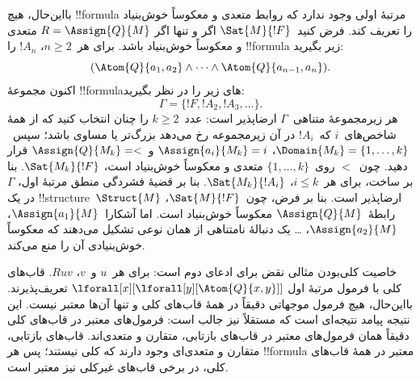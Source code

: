 \documentclass[../../../include/open-logic-section]{subfiles}
\begin{document}
بااین‌حال، هیچ !!{formula} مرتبهٔ اولی وجود ندارد که روابط متعدی و
معکوساً خوش‌بنیاد را تعریف کند. فرض کنید~$\Sat{M}{!F}$ اگر و تنها اگر
$R = \Assign{Q}{M}$ متعدی و معکوساً خوش‌بنیاد باشد. برای هر~$n \ge 2$،
$!A_n$ را !!{formula} زیر بگیرید:
\[
(\Atom{Q}{a_1,a_2} \land \dots \land
    \Atom{Q}{a_{n-1},a_{n}}).
\]
اکنون مجموعهٔ !!{formula}های زیر را در نظر بگیرید:
\[
\Gamma = \{!F, !A_2, !A_3, \dots\}.
\]
هر زیرمجموعهٔ متناهی~$\Gamma$ ارضاپذیر است: عدد~$k \ge 2$ را چنان
انتخاب کنید که از همهٔ شاخص‌های~$i$ که~$!A_i$ در آن زیرمجموعه رخ می‌دهد
بزرگ‌تر یا مساوی باشد؛ سپس~$\Domain{M_k} = \{1, \dots, k\}$،
$\Assign{a_i}{M_k} = i$ و~$\Assign{Q}{M_k} = <$ قرار دهید. چون~$<$
روی~$\{1,\dots,k\}$ متعدی و معکوساً خوش‌بنیاد است، $\Sat{M_k}{!F}$.
بنا بر ساخت، برای هر~$i \le k$، $\Sat{M_k}{!A_i}$. بنا بر قضیهٔ فشردگی
منطق مرتبهٔ اول، $\Gamma$ در یک !!{structure}~$\Struct{M}$ ارضاپذیر
است. بنا بر فرض، چون~$\Sat{M}{!F}$، رابطهٔ~$\Assign{Q}{M}$ معکوساً
خوش‌بنیاد است. اما آشکارا~$\Assign{a_1}{M}$، $\Assign{a_2}{M}$،
\dots{} یک دنبالهٔ نامتناهی از همان نوعی تشکیل می‌دهند که
معکوساً خوش‌بنیادی آن را منع می‌کند.

خاصیت کلی‌بودن مثالی نقض برای ادعای دوم است: برای هر~$u$ و~$v$،
$Ruv$. قاب‌های کلی با فرمول مرتبهٔ اول
$\lforall[x][\lforall[y][\Atom{Q}{x,y}]]$ تعریف‌پذیرند. بااین‌حال، هیچ
فرمول موجهاتی دقیقاً در همهٔ قاب‌های کلی و تنها آن‌ها معتبر نیست. این
نتیجه پیامد نتیجه‌ای است که مستقلاً نیز جالب است: فرمول‌های معتبر در
قاب‌های کلی دقیقاً همان فرمول‌های معتبر در قاب‌های بازتابی، متقارن و
متعدی‌اند. قاب‌های بازتابی، متقارن و متعدی‌ای وجود دارند که کلی نیستند؛
پس هر !!{formula} معتبر در همهٔ قاب‌های کلی، در برخی قاب‌های غیرکلی نیز
معتبر است.
\end{document}
